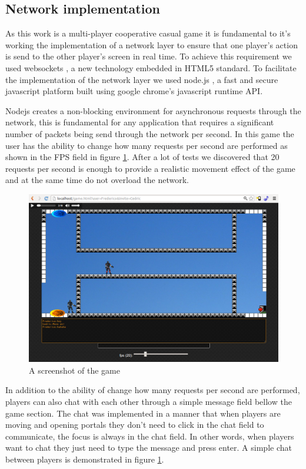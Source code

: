 \documentclass{chi-ext}
\begin{document}
\subsection{Network implementation}
As this work is a multi-player cooperative casual game it is fundamental to it's working the implementation of a network layer to ensure that one player's action is send to the other player's screen in real time. To achieve this requirement we used websockets \cite{websockets}, a new technology embedded in HTML5 standard. To facilitate the implementation of the network layer we used node.js \cite{nodejs}, a fast and secure javascript platform built using google chrome's javascript runtime API.

Nodejs creates a non-blocking environment for asynchronous requests through the network, this is fundamental for any application that requires a significant number of packets being send through the network per second. In this game the user has the ability to change how many requests per second are performed as shown in the FPS field in figure \ref{fig:game}. After a lot of tests we discovered that 20 requests per second is enough to provide a realistic movement effect of the game and at the same time do not overload the network.

\begin{figure}
\hspace*{-0.4\columnwidth}%
\parbox{1.4\columnwidth}{
  \centering
  \includegraphics[width=1.4\columnwidth]{game.png}
  \caption{A screenshot of the game}
  \label{fig:game}
}
\end{figure}

In addition to the ability of change how many requests per second are performed, players can also chat with each other through a simple message field bellow the game section. The chat was implemented in a manner that when players are moving and opening portals they don't need to click in the chat field to communicate, the focus is always in the chat field. In other words, when players want to chat they just need to type the message and press enter. A simple chat between players is demonstrated in figure \ref{fig:game}.
\end{document}
